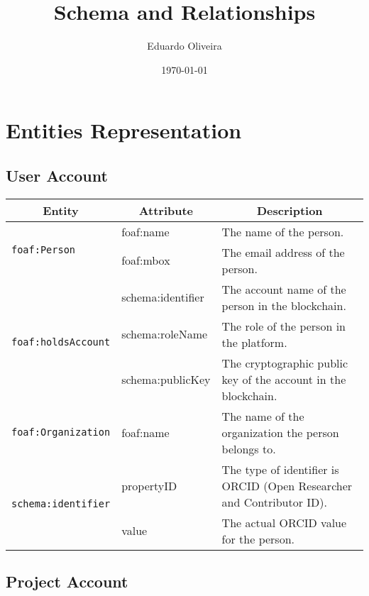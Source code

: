\documentclass{article}
\title{Schema and Relationships}
\author{Eduardo Oliveira}
\date{\today}
\begin{document}
\maketitle

\section{Entities Representation}

\subsection{User Account}

\begin{longtable}{|l|l|p{8cm}|}
    \hline
    \multicolumn{1}{|c|}{\textbf{Entity}} & 
    \multicolumn{1}{c|}{\textbf{Attribute}} & 
    \multicolumn{1}{c|}{\textbf{Description}} \\
    \hline
    \multirow{2}{*}{\texttt{foaf:Person}}  
        & foaf:name & The name of the person. \\ \cline{2-3}
        & foaf:mbox & The email address of the person. \\ \cline{2-3} 
    \hline
    \multirow{3}{*}{\texttt{foaf:holdsAccount}}  
        & schema:identifier & The account name of the person in the blockchain. \\ \cline{2-3}
        & schema:roleName & The role of the person in the platform. \\ \cline{2-3}
        & schema:publicKey & The cryptographic public key of the account in the blockchain. \\ 
    \hline
    \multirow{1}{*}{\texttt{foaf:Organization}}  
        & foaf:name & The name of the organization the person belongs to. \\ \cline{1-3}
         
    \hline
    \multirow{2}{*}{\texttt{schema:identifier}}  
        & propertyID & The type of identifier is ORCID (Open Researcher and Contributor ID). \\ \cline{2-3}
        & value & The actual ORCID value for the person. \\ 
    \hline
    \end{longtable}
    
\subsection{Project Account}
\end{document}
